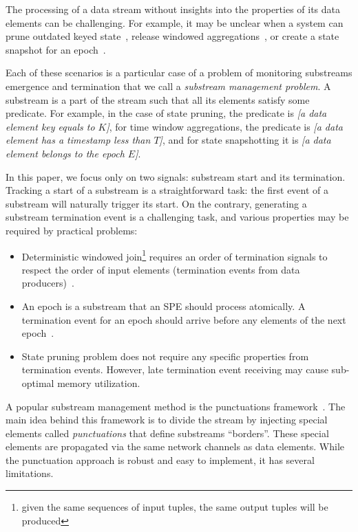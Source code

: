\label {fs-acker-intro}

The processing of a data stream without insights into the properties of its data elements can be challenging. For example, it may be unclear when a system can prune outdated keyed state~\cite{Tucker:2003:EPS:776752.776780}, release windowed aggregations~\cite{Begoli:2019:OSR:3299869.3314040}, or create a state snapshot for an epoch~\cite{Carbone:2017:SMA:3137765.3137777}.

Each of these scenarios is a particular case of a problem of monitoring substreams emergence and termination that we call a {\em substream management problem}. A substream is a part of the stream such that all its elements satisfy some predicate. 
For example, in the case of state pruning, the predicate is {\em [a data element key equals to $K$]}, for time window aggregations, the predicate is {\em [a data element has a timestamp less than $T$]}, and for state snapshotting it is {\em [a data element belongs to the epoch $E$]}.

In this paper, we focus only on two signals: substream start and its termination. Tracking a start of a substream is a straightforward task: the first event of a substream will naturally trigger its start. On the contrary, generating a substream termination event is a challenging task, and various properties may be required by practical problems:
\begin{itemize}
    \item Deterministic windowed join\footnote{given the same sequences of input tuples, the same output tuples will be produced} requires an order of termination signals to respect the order of input elements (termination events from data producers)~\cite{najdataei2019stretch, gulisano2016scalejoin}.
    \item An epoch is a substream that an SPE should process atomically. A termination event for an epoch should arrive before any elements of the next epoch~\cite{2015arXiv150608603C}.
    \item State pruning problem does not require any specific properties from termination events. However, late termination event receiving may cause sub-optimal memory utilization.
\end{itemize}

A popular substream management method is the punctuations framework~\cite{tucker2003exploiting}. The main idea behind this framework is to divide the stream by injecting special elements called {\em punctuations} that define substreams ``borders''. These special elements are propagated via the same network channels as data elements. While the punctuation approach is robust and easy to implement, it has several limitations. 

